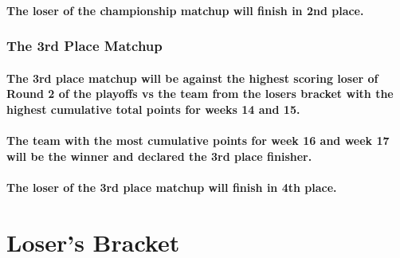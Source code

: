 \documentclass[
]{book}
\begin{document}
\hypertarget{the-loser-of-the-championship-matchup-will-finish-in-2nd-place.}{%
\paragraph{The loser of the championship matchup will finish in 2nd place.}\label{the-loser-of-the-championship-matchup-will-finish-in-2nd-place.}}

\hypertarget{the-3rd-place-matchup}{%
\subsubsection{The 3rd Place Matchup}\label{the-3rd-place-matchup}}

\hypertarget{the-3rd-place-matchup-will-be-against-the-highest-scoring-loser-of-round-2-of-the-playoffs-vs-the-team-from-the-losers-bracket-with-the-highest-cumulative-total-points-for-weeks-14-and-15.}{%
\paragraph{The 3rd place matchup will be against the highest scoring loser of Round 2 of the playoffs vs the team from the losers bracket with the highest cumulative total points for weeks 14 and 15.}\label{the-3rd-place-matchup-will-be-against-the-highest-scoring-loser-of-round-2-of-the-playoffs-vs-the-team-from-the-losers-bracket-with-the-highest-cumulative-total-points-for-weeks-14-and-15.}}

\hypertarget{the-team-with-the-most-cumulative-points-for-week-16-and-week-17-will-be-the-winner-and-declared-the-3rd-place-finisher.}{%
\paragraph{The team with the most cumulative points for week 16 and week 17 will be the winner and declared the 3rd place finisher.}\label{the-team-with-the-most-cumulative-points-for-week-16-and-week-17-will-be-the-winner-and-declared-the-3rd-place-finisher.}}

\hypertarget{the-loser-of-the-3rd-place-matchup-will-finish-in-4th-place.}{%
\paragraph{The loser of the 3rd place matchup will finish in 4th place.}\label{the-loser-of-the-3rd-place-matchup-will-finish-in-4th-place.}}

\hypertarget{losers-bracket}{%
\section{Loser's Bracket}\label{losers-bracket}}
\end{document}
